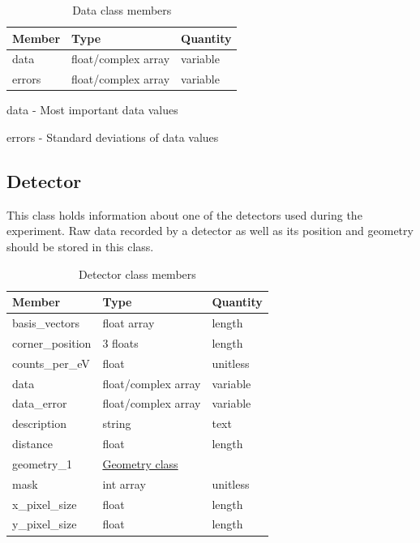 \documentclass[usletter,11pt]{article}
\newcommand{\member}[2]
{ \noindent
{ \color{softBlue}  #1 - } #2
\vspace{0.2cm}
}
\begin{document}
\begin{table}[h!]\sffamily \footnotesize
\caption{Data class members}

\begin{tabular}{p{4.5cm} p{4.5cm}  p{2.5cm} }
\toprule
\bfseries Member     & \bfseries Type & \bfseries Quantity \\
\midrule
data  & float/complex array & variable  \\
errors  & float/complex array & variable \\
\bottomrule
\end{tabular}
\end{table}

\member{data}{Most important data values}

\member{errors}{Standard deviations of data values}

\subsection{Detector}
\label{table:detector}

This class holds information about one of the detectors used during
the experiment. Raw data recorded by a detector as well as its position
and geometry should be stored in this class.

\begin{table}[h!]\sffamily \footnotesize
\caption{Detector class members}

\begin{tabular}{p{4.5cm} p{4.5cm}  p{2.5cm} }
\toprule
\bfseries Member     & \bfseries Type & \bfseries Quantity \\
\midrule


basis\_vectors & float array & length \\ 
corner\_position & 3 floats & length \\
counts\_per\_eV & float & unitless \\ 
data     & float/complex array & variable  \\
data\_error & float/complex array & variable \\
description & string & text \\
distance     & float & length\\
geometry\_1 &  \hyperref[table:geometry]{Geometry class} & \\
mask & int array & unitless \\
x\_pixel\_size & float & length  \\
y\_pixel\_size & float & length \\
\bottomrule
\end{tabular}
\end{table}
\end{document}
